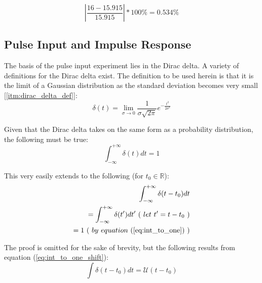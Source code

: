 \documentclass{article}
\begin{document}
	\begin{equation}
	\label{eq:hpf_cutoff_error}
	|\frac{16 - 15.915}{15.915}| * 100\% = 0.534\%
	\end{equation}
	
	\subsection{Pulse Input and Impulse Response}
	The basis of the pulse input experiment lies in the Dirac delta. A variety of definitions for the Dirac delta exist. The definition to be used herein is that it is the limit of a Gaussian distribution as the standard deviation becomes very small [\ref{itm:dirac_delta_def}]:
	\begin{equation}
	\label{eq:dirac_delta_def}
	\delta(t) = \lim_{\sigma \to 0} \frac{ 1 }{ \sigma \sqrt{ 2 \pi } } e^{ - \frac{ t^2 }{ 2\sigma^2 } }
	\end{equation}
	
	Given that the Dirac delta takes on the same form as a probability distribution, the following must be true:
	\begin{equation}
	\label{eq:int_to_one}
	\int_{-\infty}^{+\infty}{\delta(t)dt} = 1
	\end{equation}
	
	This very easily extends to the following (for $t_0 \in \mathbb{R}$):
	\begin{equation}
	\begin{aligned}
	\label{eq:int_to_one_shift}
	\int_{-\infty}^{+\infty}{\delta(t-t_0)dt} \\
	= \int_{-\infty}^{+\infty}{\delta(t')dt'} \ ( \ let \ t' = t - t_0 \ ) \\
	= 1 \ ( \ by \ equation \ (\ref{eq:int_to_one}) \ )
	\end{aligned}
	\end{equation}
	
	The proof is omitted for the sake of brevity, but the following results from equation (\ref{eq:int_to_one_shift}):
	\begin{equation}
	\label{eq:int_of_dirac_is_step}
	\int \delta( t - t_0 )dt = \mathcal{U}( t - t_0 )
	\end{equation}
	
\end{document}
